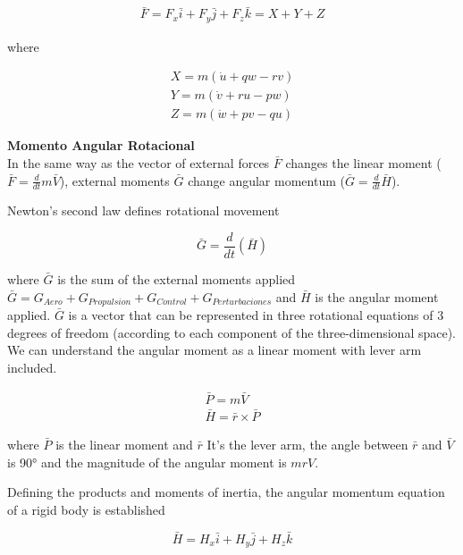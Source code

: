 \begin{gather}
\label{eq: momento lineal}
    \bar{F} = F_x \bar{i} + F_y \bar{j} + F_z \bar{k} = X + Y + Z 
\end{gather}

where

\begin{gather}
\label{eq dinam tras 1}
    X = m(\dot{u} + qw - rv) \\
    Y = m(\dot{v} + ru - pw) \\
    Z = m(\dot{w} + pv - qu)
\label{eq dinam tras 2}
\end{gather}


\medskip
\textbf{Momento Angular Rotacional}\\
In the same way as the vector of external forces $\bar{F}$ changes the linear moment ($\bar{F}=\frac{d}{dt}m\bar{V}$), external moments $\bar{G}$ change angular momentum ($\bar{G}=\frac{d}{dt}\bar{H}$).

Newton's second law defines rotational movement

\begin{equation}
\label{eq: movimiento rotacional}
\bar{G} = \frac{d}{dt}(\bar{H})
\end{equation}

where $\bar{G}$ is the sum of the external moments applied $\bar{G}=G_{Aero}+G_{Propulsion}+G_{Control}+G_{Perturbaciones}$ and $\bar{H}$ is the angular moment applied. 
$\bar{G}$ is a vector that can be represented in three rotational equations of 3 degrees of freedom (according to each component of the three-dimensional space). We can understand the angular moment as a linear moment with lever arm included. 

\begin{gather}
    \bar{P} = m\bar{V} \\
    \bar{H} = \bar{r} \times \bar{P}
\end{gather}

where $\bar{P}$ is the linear moment and  $\bar{r}$ It's the lever arm, the angle between $\bar{r}$ and $\bar{V}$ is 90° and the magnitude of the angular moment is $mrV$. 

Defining the products and moments of inertia, the angular momentum equation of a rigid body is established 

\begin{equation}
    \bar{H} = H_x \bar{i} + H_y \bar{j} + H_z \bar{k}
\end{equation}

